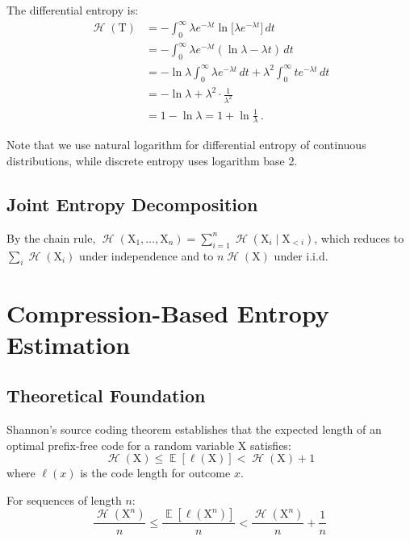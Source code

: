 \documentclass[final,11pt]{article}
\newcommand{\rv}[1]{\mathrm{#1}}
\newcommand{\entropy}{\operatorname{\mathcal{H}}}
\DeclareMathOperator{\expectation}{\mathbb{E}}
\numberwithin{equation}{section}
\theoremstyle{plain}
\theoremstyle{remark}
\begin{document}
The differential entropy is:
\begin{equation}
\begin{split}
    \entropy(\rv{T}) &= -\int_0^{\infty} \lambda e^{-\lambda t} \ln\bigl[\lambda e^{-\lambda t}\bigr] \, dt\\
    &= -\int_0^{\infty} \lambda e^{-\lambda t} (\ln \lambda - \lambda t) \, dt\\
    &= -\ln \lambda \int_0^{\infty} \lambda e^{-\lambda t} \, dt + \lambda^2 \int_0^{\infty} t e^{-\lambda t} \, dt\\
    &= -\ln \lambda + \lambda^2 \cdot \frac{1}{\lambda^2}\\
    &= 1 - \ln \lambda = 1 + \ln \frac{1}{\lambda}\,.
\end{split}
\end{equation}

Note that we use natural logarithm for differential entropy of continuous distributions, while discrete entropy uses logarithm base 2.

\subsection{Joint Entropy Decomposition}
By the chain rule, $\entropy(\rv{X}_1, \ldots, \rv{X}_n) = \sum_{i=1}^{n} \entropy(\rv{X}_i \mid \rv{X}_{<i})$, which reduces to $\sum_i \entropy(\rv{X}_i)$ under independence and to $n \entropy(\rv{X})$ under i.i.d.

\section{Compression-Based Entropy Estimation}
\label{app:compression_estimation}

\subsection{Theoretical Foundation}
Shannon's source coding theorem establishes that the expected length of an optimal prefix-free code for a random variable $\rv{X}$ satisfies:
\begin{equation}
    \entropy(\rv{X}) \leq \expectation[\ell(\rv{X})] < \entropy(\rv{X}) + 1
\end{equation}
where $\ell(x)$ is the code length for outcome $x$.

For sequences of length $n$:
\begin{equation}
    \frac{\entropy(\rv{X}^n)}{n} \leq \frac{\expectation[\ell(\rv{X}^n)]}{n} < \frac{\entropy(\rv{X}^n)}{n} + \frac{1}{n}
\end{equation}
\end{document}
